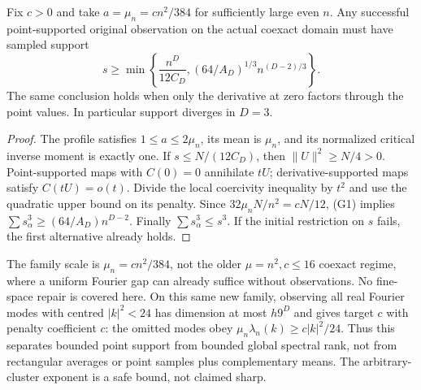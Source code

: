 \begin{proposition}\label{prop:geo-point}
Fix $c>0$ and take $a=\mu_n=cn^2/384$ for sufficiently large even $n$.
Any successful point-supported original observation on the actual coexact
domain must have sampled support
\[
 s\geq\min\left\{\frac{n^D}{12C_D},
       (64/A_D)^{1/3}n^{(D-2)/3}\right\}.
\]
The same conclusion holds when only the derivative at zero factors through
the point values. In particular support diverges in $D=3$.
\end{proposition}
\begin{proof}
The profile satisfies $1\leq a\leq2\mu_n$, its mean is $\mu_n$, and its
normalized critical inverse moment is exactly one. If $s\leq N/(12C_D)$,
then $\|U\|^2\geq N/4>0$. Point-supported maps with $C(0)=0$ annihilate
$tU$; derivative-supported maps satisfy $C(tU)=o(t)$. Divide the local
coercivity inequality by $t^2$ and use the quadratic upper bound on its
penalty. Since $32\mu_nN/n^2=cN/12$, (G1) implies
$\sum s_\alpha^3\geq(64/A_D)n^{D-2}$. Finally $\sum s_\alpha^3\leq s^3$.
If the initial restriction on $s$ fails, the first alternative already holds.
\end{proof}
The family scale is $\mu_n=cn^2/384$, not the older $\mu=n^2,c\leq16$
coexact regime, where a uniform Fourier gap can already suffice without
observations. No fine-space repair is covered here. On this same new
family, observing all real Fourier modes with centred $|k|^2<24$ has
dimension at most $h9^D$ and gives target $c$ with penalty coefficient $c$:
the omitted modes obey $\mu_n\lambda_n(k)\geq c|k|^2/24$.
Thus this separates bounded point support from bounded global spectral
rank, not from rectangular averages or point samples plus complementary
means. The arbitrary-cluster exponent is a safe bound, not claimed sharp.

